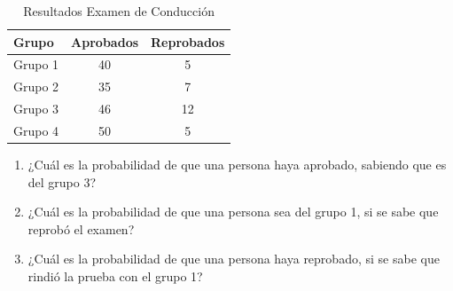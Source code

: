 \documentclass[12pt, letterpaper]{article}
\begin{document}
\begin{enumerate}
	      \begin{table}[h!]
		      \caption{Resultados Examen de Conducción}\label{tab:ResultadosExamen}
		      \centering
		      \begin{tabular}{|l|c|c|}
			      \hline
			      \textbf{Grupo} & \textbf{Aprobados} & \textbf{Reprobados} \\
			      \hline
			      Grupo 1        & 40                 & 5                   \\
			      Grupo 2        & 35                 & 7                   \\
			      Grupo 3        & 46                 & 12                  \\
			      Grupo 4        & 50                 & 5                   \\
			      \hline
		      \end{tabular}
	      \end{table}
	      \begin{enumerate}
		      \item ¿Cuál es la probabilidad de que una persona haya aprobado, sabiendo que es del grupo 3?
		      \item ¿Cuál es la probabilidad de que una persona sea del grupo 1, si se sabe que reprobó el examen?
		      \item ¿Cuál es la probabilidad de que una persona haya reprobado, si se sabe que rindió la prueba con el grupo 1?
	      \end{enumerate}
\end{enumerate}
\end{document}
